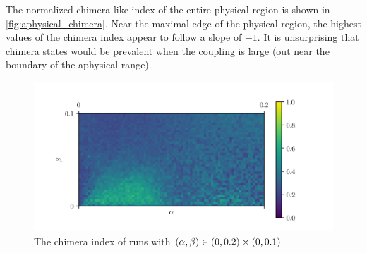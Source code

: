 The normalized chimera-like index of the entire physical region is shown in \cref{fig:aphysical_chimera}.
Near the maximal edge of the physical region, the highest values of the chimera index appear to follow a slope of $-1$.
It is unsurprising that chimera states would be prevalent when the coupling is large (out near the boundary of the aphysical range).
\begin{figure}[ht]
  \centering
  \includegraphics{figure/zoom_chimera}
  \caption[Zoomed landscape]{The chimera index of runs with $(\alpha, \beta) \in (0, 0.2) \times (0, 0.1)$.}
  \label{fig:zoom_chimera}
\end{figure}

